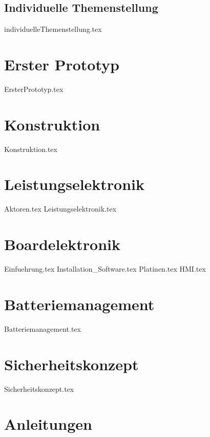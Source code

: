 \documentclass[paper=a4,12pt]{scrreprt}
\begin{document}
\section{Individuelle Themenstellung}
{individuelleThemenstellung.tex}

\chapter{Erster Prototyp}
{ErsterPrototyp.tex}

\chapter{Konstruktion}
{Konstruktion.tex}

\chapter{Leistungselektronik}
{Aktoren.tex}
{Leistungselektronik.tex}

\chapter{Boardelektronik}
{Einfuehrung.tex}
{Installation_Software.tex}
{Platinen.tex}
{HMI.tex}

\chapter{Batteriemanagement}
{Batteriemanagement.tex}

\chapter{Sicherheitskonzept}
{Sicherheitskonzept.tex}

\chapter{Anleitungen}
\end{document}
